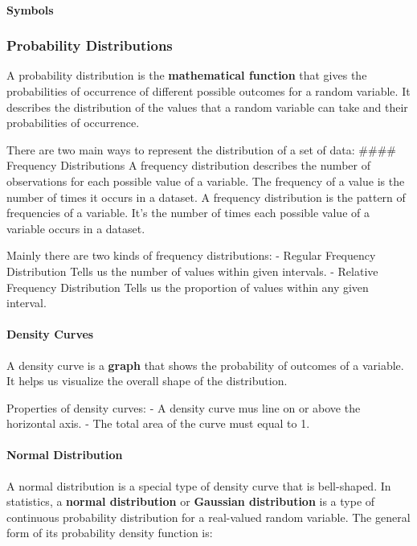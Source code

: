 \documentclass[11pt]{article}
\begin{document}
\hypertarget{symbols}{%
\paragraph{Symbols}\label{symbols}}

\hypertarget{probability-distributions}{%
\subsubsection{Probability
Distributions}\label{probability-distributions}}

A probability distribution is the \textbf{mathematical function} that
gives the probabilities of occurrence of different possible outcomes for
a random variable. It describes the distribution of the values that a
random variable can take and their probabilities of occurrence.

There are two main ways to represent the distribution of a set of data:
\#\#\#\# Frequency Distributions A frequency distribution describes the
number of observations for each possible value of a variable. The
frequency of a value is the number of times it occurs in a dataset. A
frequency distribution is the pattern of frequencies of a variable. It's
the number of times each possible value of a variable occurs in a
dataset.

Mainly there are two kinds of frequency distributions: - Regular
Frequency Distribution Tells us the number of values within given
intervals. - Relative Frequency Distribution Tells us the proportion of
values within any given interval.

\hypertarget{density-curves}{%
\paragraph{Density Curves}\label{density-curves}}

A density curve is a \textbf{graph} that shows the probability of
outcomes of a variable. It helps us visualize the overall shape of the
distribution.


Properties of density curves: - A density curve mus line on or above the
horizontal axis. - The total area of the curve must equal to 1.

\hypertarget{normal-distribution}{%
\paragraph{Normal Distribution}\label{normal-distribution}}

A normal distribution is a special type of density curve that is
bell-shaped. In statistics, a \textbf{normal distribution} or
\textbf{Gaussian distribution} is a type of continuous probability
distribution for a real-valued random variable. The general form of its
probability density function is:
\end{document}
